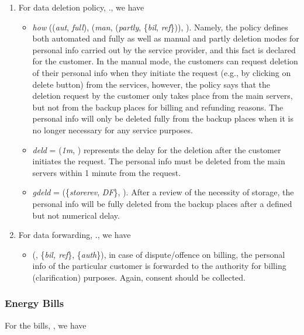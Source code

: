 \documentclass[a4paper]{article}
\begin{document}
\begin{enumerate}
\item For data deletion policy, ., we have 
\begin{itemize} 
\item \textit{how}  ((\textit{aut}, \textit{full}), (\textit{man}, (\textit{partly}, \{\textit{bil}, \textit{ref}\})), ). Namely, the policy defines both automated and fully as well as manual and partly deletion modes for personal info carried out by the service provider, and this fact is declared for the customer. In the manual mode, the customers can request deletion of their personal info when they initiate the request (e.g., by clicking on delete button) from the services, however, the policy says that the deletion request by the customer only takes place from the main servers, but not from the backup places for billing and refunding reasons. The personal info will only be deleted fully from the backup places when it is no longer necessary for any service purposes.   

\item \textit{deld} = (\textit{1m}, ) represents the delay for the deletion after the customer initiates the request. The personal info must be deleted from the main servers within 1 minute from the request.        

\item \textit{gdeld} = (\{\textit{storerev}, \textit{DF}\}, ). After a review of the necessity of storage, the personal info will be fully deleted from the backup places after a defined but not numerical delay.    
\end{itemize}   

\item For data forwarding, ., we have  

\begin{itemize}
\item (, \{\textit{bil, ref}\}, \{\textit{auth}\}), in case of dispute/offence on billing, the personal info of the particular customer is forwarded to the authority for billing (clarification) purposes. Again, consent should be collected.     
\end{itemize}   
\end{enumerate}

\subsubsection{Energy Bills}  For the bills, , we have 

\begin{center}
\noindent\fbox{\parbox{6.7cm}{\ \ \ \ \ \ \ \ \   (, , , )     
     }
}
\end{center} 
\end{document}
